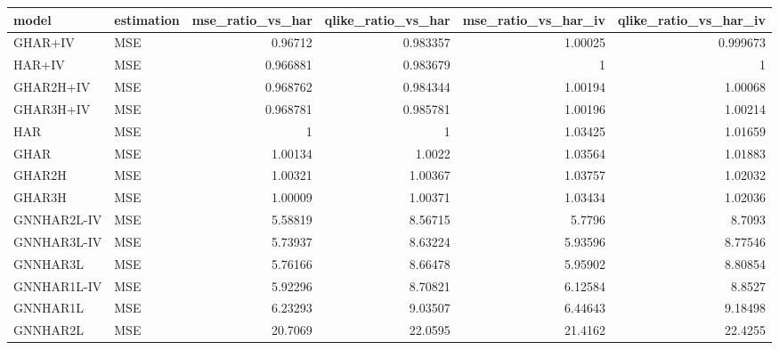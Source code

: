 \begin{tabular}{llrrrr}
\toprule
model & estimation & mse_ratio_vs_har & qlike_ratio_vs_har & mse_ratio_vs_har_iv & qlike_ratio_vs_har_iv \\
\midrule
GHAR+IV & MSE & 0.96712 & 0.983357 & 1.00025 & 0.999673 \\
HAR+IV & MSE & 0.966881 & 0.983679 & 1 & 1 \\
GHAR2H+IV & MSE & 0.968762 & 0.984344 & 1.00194 & 1.00068 \\
GHAR3H+IV & MSE & 0.968781 & 0.985781 & 1.00196 & 1.00214 \\
HAR & MSE & 1 & 1 & 1.03425 & 1.01659 \\
GHAR & MSE & 1.00134 & 1.0022 & 1.03564 & 1.01883 \\
GHAR2H & MSE & 1.00321 & 1.00367 & 1.03757 & 1.02032 \\
GHAR3H & MSE & 1.00009 & 1.00371 & 1.03434 & 1.02036 \\
GNNHAR2L-IV & MSE & 5.58819 & 8.56715 & 5.7796 & 8.7093 \\
GNNHAR3L-IV & MSE & 5.73937 & 8.63224 & 5.93596 & 8.77546 \\
GNNHAR3L & MSE & 5.76166 & 8.66478 & 5.95902 & 8.80854 \\
GNNHAR1L-IV & MSE & 5.92296 & 8.70821 & 6.12584 & 8.8527 \\
GNNHAR1L & MSE & 6.23293 & 9.03507 & 6.44643 & 9.18498 \\
GNNHAR2L & MSE & 20.7069 & 22.0595 & 21.4162 & 22.4255 \\
\bottomrule
\end{tabular}
